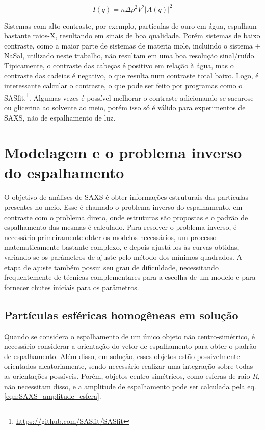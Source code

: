 		\begin{equation}
		I(q) = n\Delta \rho^2 V^2 |A(q)|^2
		\label{eqn:SAXS_I_funcao_A}
		\end{equation}
		
		Sistemas com alto contraste, por exemplo, partículas de ouro em água, espalham bastante raios-X, resultando em sinais de boa qualidade. Porém sistemas de baixo contraste, como a maior parte de sistemas de materia mole, incluindo o sistema \CTAB{} + NaSal, utilizado neste trabalho, não resultam em uma boa resolução sinal/ruído. Tipicamente, o contraste das cabeças é positivo em relação à água, mas o contraste das cadeias é negativo, o que resulta num contraste total baixo. Logo, é interessante calcular o contraste, o que pode ser feito por programas como o SASfit.\footnote{\url{https://github.com/SASfit/SASfit}}. Algumas vezes é possível melhorar o contraste adicionando-se sacarose ou glicerina ao solvente ao meio, porém isso só é válido para experimentos de SAXS, não de espalhamento de luz.
		
		\section{Modelagem e o problema inverso do espalhamento}
		
		O objetivo de análises de SAXS é obter informações estruturais das partículas presentes no meio. Esse é chamado o problema inverso do espalhamento, em contraste com o problema direto, onde estruturas são propostas e o padrão de espalhamento das mesmas é calculado. Para resolver o problema inverso, é necessário primeiramente obter os modelos necessários, um processo matematicamente bastante complexo, e depois ajustá-los às curvas obtidas, variando-se os parâmetros de ajuste pelo método dos mínimos quadrados. A etapa de ajuste também possui seu grau de dificuldade, necessitando frequentemente de técnicas complementares para a escolha de um modelo e para fornecer chutes iniciais para os parâmetros.
		
		\subsection{Partículas esféricas homogêneas em solução} 
		
		Quando se considera o espalhamento de um único objeto não centro-simétrico, é necessário considerar a orientação do vetor de espalhamento \q{} para obter o padrão de espalhamento. Além disso, em solução, esses objetos estão possivelmente orientados aleatoriamente, sendo necessário realizar uma integração sobre todas as orientações possíveis. Porém, objetos centro-simétricos, como esferas de raio \(R\), não necessitam disso, e a amplitude de espalhamento pode ser calculada pela eq. \ref{eqn:SAXS_amplitude_esfera}. %
		
